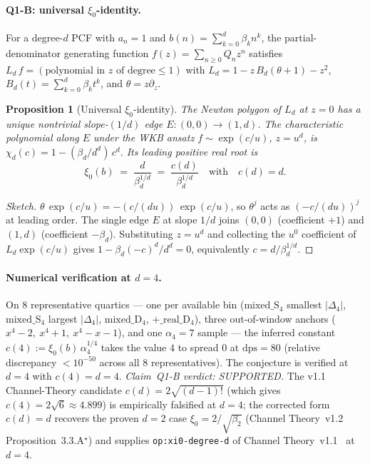 \documentclass[11pt,a4paper]{article}
\newtheorem{proposition}[conjecture]{Proposition}
\theoremstyle{definition}
\theoremstyle{remark}
\begin{document}
\paragraph{Q1-B: universal $\xi_{0}$-identity.}
For a degree-$d$ PCF with $a_{n}=1$ and
$b(n)=\sum_{k=0}^{d}\beta_{k}n^{k}$, the partial-denominator
generating function $f(z)=\sum_{n\ge 0}Q_{n}z^{n}$ satisfies
$L_{d}\,f=(\text{polynomial in }z\text{ of degree}\le 1)$ with
$L_{d}=1-z\,B_{d}(\theta+1)-z^{2}$,
$B_{d}(t)=\sum_{k=0}^{d}\beta_{k}t^{k}$, and $\theta=z\partial_{z}$.

\begin{proposition}[Universal $\xi_{0}$-identity]\label{prop:xi0-univ}
The Newton polygon of $L_{d}$ at $z=0$ has a unique nontrivial
slope-$(1/d)$ edge $E:(0,0)\to(1,d)$. The characteristic polynomial
along $E$ under the WKB ansatz $f\sim\exp(c/u)$, $z=u^{d}$, is
\(
\chi_{d}(c)=1-(\beta_{d}/d^{d})\,c^{d}.
\)
Its leading positive real root is
\[
\boxed{\;\xi_{0}(b)\;=\;\frac{d}{\beta_{d}^{1/d}}\;=\;\frac{c(d)}{\beta_{d}^{1/d}}\quad\text{with}\quad c(d)=d.\;}
\]
\end{proposition}

\begin{proof}[Sketch]
$\theta\,\exp(c/u)=-(c/(d u))\,\exp(c/u)$, so $\theta^{j}$ acts as
$(-c/(d u))^{j}$ at leading order. The single edge $E$ at slope $1/d$
joins $(0,0)$ (coefficient $+1$) and $(1,d)$ (coefficient $-\beta_{d}$).
Substituting $z=u^{d}$ and collecting the $u^{0}$ coefficient of
$L_{d}\exp(c/u)$ gives $1-\beta_{d}(-c)^{d}/d^{d}=0$, equivalently
$c=d/\beta_{d}^{1/d}$.
\end{proof}

\paragraph{Numerical verification at $d=4$.}
On $8$ representative quartics --- one per available bin
($\mathrm{mixed\_S_{4}}$ smallest $|\Delta_{4}|$, $\mathrm{mixed\_S_{4}}$
largest $|\Delta_{4}|$, $\mathrm{mixed\_D_{4}}$,
$+\_\mathrm{real\_D_{4}}$), three out-of-window anchors
($x^{4}-2,\ x^{4}+1,\ x^{4}-x-1$), and one $\alpha_{4}=7$
sample --- the inferred constant
$c(4):=\xi_{0}(b)\,\alpha_{4}^{1/4}$ takes the value $4$ to spread
$0$ at $\mathrm{dps}=80$ (relative discrepancy $<10^{-50}$ across
all $8$ representatives). The conjecture is verified at $d=4$ with
$c(4)=d=4$. \emph{Claim~Q1-B verdict: SUPPORTED.} The v1.1
Channel-Theory candidate $c(d)=2\sqrt{(d-1)!}$ (which gives
$c(4)=2\sqrt{6}\approx 4.899$) is empirically falsified at $d=4$; the
corrected form $c(d)=d$ recovers the proven $d=2$ case
$\xi_{0}=2/\sqrt{\beta_{2}}$ (Channel
Theory~v1.2~\cite{Papanokechi2026Channel} Proposition~3.3.A$^{\star}$)
and supplies \texttt{op:xi0-degree-d} of Channel
Theory~v1.1~\cite{Papanokechi2026Channel} at $d=4$.
\end{document}
